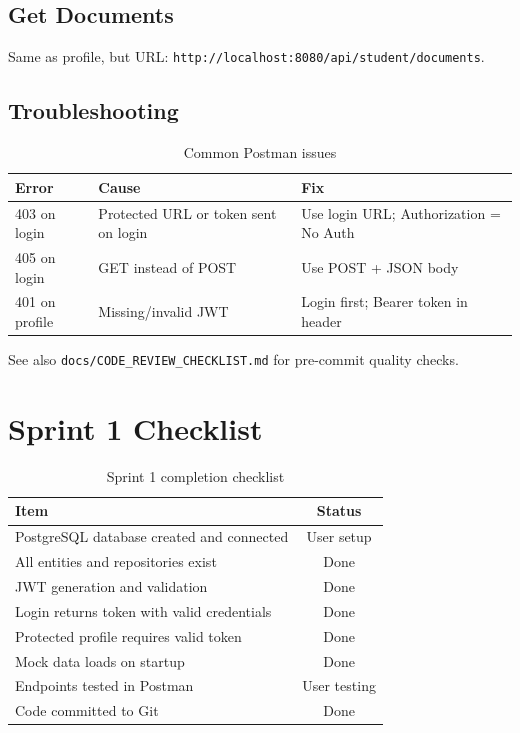 \documentclass[11pt,a4paper]{article}
\begin{document}
\subsection{Get Documents}

Same as profile, but URL: \texttt{http://localhost:8080/api/student/documents}.

\subsection{Troubleshooting}

\begin{table}[h]
\centering
\small
\begin{tabular}{@{}lll@{}}
\toprule
\textbf{Error} & \textbf{Cause} & \textbf{Fix} \\
\midrule
403 on login & Protected URL or token sent on login & Use login URL; Authorization = No Auth \\
405 on login & GET instead of POST & Use POST + JSON body \\
401 on profile & Missing/invalid JWT & Login first; Bearer token in header \\
\bottomrule
\end{tabular}
\caption{Common Postman issues}
\end{table}

See also \texttt{docs/CODE\_REVIEW\_CHECKLIST.md} for pre-commit quality checks.

\section{Sprint 1 Checklist}

\begin{table}[h]
\centering
\begin{tabular}{@{}lc@{}}
\toprule
\textbf{Item} & \textbf{Status} \\
\midrule
PostgreSQL database created and connected & User setup \\
All entities and repositories exist     & Done \\
JWT generation and validation           & Done \\
Login returns token with valid credentials& Done \\
Protected profile requires valid token    & Done \\
Mock data loads on startup                & Done \\
Endpoints tested in Postman               & User testing \\
Code committed to Git                     & Done \\
\bottomrule
\end{tabular}
\caption{Sprint 1 completion checklist}
\end{table}
\end{document}
